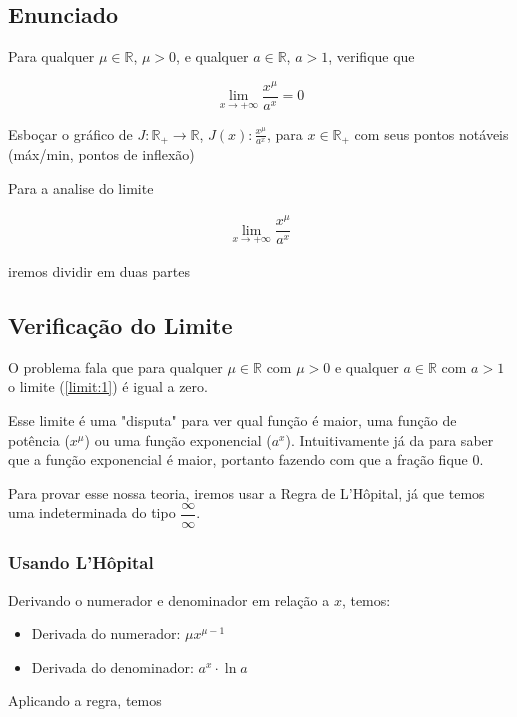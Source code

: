 \documentclass[../resumo.tex]{subfiles}
\begin{document}
	\subsection{Enunciado}

	Para qualquer $\mu \in \mathbb{R}$, $\mu > 0$, e qualquer $a \in \mathbb{R}$, $a > 1$, verifique que

	\[ \lim_{x \to +\infty} \frac{x^\mu}{a^x} = 0 \]

	Esboçar o gráfico de $J: \mathbb{R}_+ \rightarrow \mathbb{R}$, $J(x): \frac{x^\mu}{a^x}$, para $x \in \mathbb{R}_+$
	com seus pontos notáveis (máx/min, pontos de inflexão)

	Para a analise do limite

	\begin{align} \label{limit:1}
		\lim_{x\to+\infty} \dfrac{x^\mu}{a^x}
	\end{align}

	iremos dividir em duas partes

	\subsection{Verificação do Limite}

	O problema fala que para qualquer $\mu \in \mathbb{R}$ com $\mu > 0$ e qualquer $a  \in \mathbb{R}$ com $a > 1$
	o limite (\ref{limit:1}) é igual a zero.

	Esse limite é uma "disputa" para ver qual função é maior, uma função de potência ($x^\mu$) ou uma função
	exponencial ($a^x$). Intuitivamente já da para saber que a função exponencial é maior, portanto fazendo
	com que a fração fique 0.

	Para provar esse nossa teoria, iremos usar a Regra de L'Hôpital, já que temos uma indeterminada do
	tipo $\dfrac{\infty}{\infty}$.

	\subsubsection{Usando L'Hôpital}

	Derivando o numerador e denominador em relação a $x$, temos:

	\begin{itemize}
		\item Derivada do numerador: $\mu x^{\mu-1}$
		\item Derivada do denominador: $a^x \cdot \ln a$
	\end{itemize}

	Aplicando a regra, temos 
\end{document}
